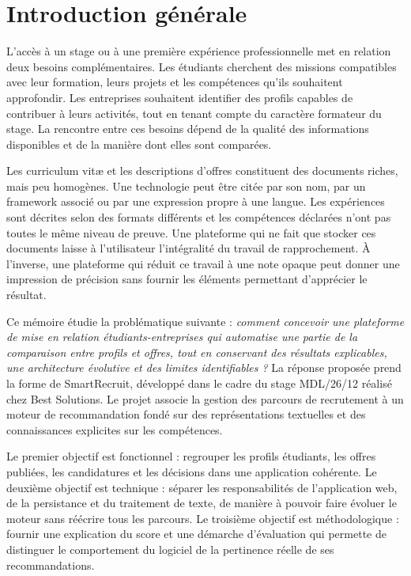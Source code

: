 \chapter*{Introduction générale}
L'accès à un stage ou à une première expérience professionnelle met en relation deux besoins complémentaires. Les étudiants cherchent des missions compatibles avec leur formation, leurs projets et les compétences qu'ils souhaitent approfondir. Les entreprises souhaitent identifier des profils capables de contribuer à leurs activités, tout en tenant compte du caractère formateur du stage. La rencontre entre ces besoins dépend de la qualité des informations disponibles et de la manière dont elles sont comparées.

Les curriculum vitæ et les descriptions d'offres constituent des documents riches, mais peu homogènes. Une technologie peut être citée par son nom, par un framework associé ou par une expression propre à une langue. Les expériences sont décrites selon des formats différents et les compétences déclarées n'ont pas toutes le même niveau de preuve. Une plateforme qui ne fait que stocker ces documents laisse à l'utilisateur l'intégralité du travail de rapprochement. À l'inverse, une plateforme qui réduit ce travail à une note opaque peut donner une impression de précision sans fournir les éléments permettant d'apprécier le résultat.

Ce mémoire étudie la problématique suivante : \emph{comment concevoir une plateforme de mise en relation étudiants-entreprises qui automatise une partie de la comparaison entre profils et offres, tout en conservant des résultats explicables, une architecture évolutive et des limites identifiables ?} La réponse proposée prend la forme de SmartRecruit, développé dans le cadre du stage MDL/26/12 réalisé chez Best Solutions. Le projet associe la gestion des parcours de recrutement à un moteur de recommandation fondé sur des représentations textuelles et des connaissances explicites sur les compétences.

Le premier objectif est fonctionnel : regrouper les profils étudiants, les offres publiées, les candidatures et les décisions dans une application cohérente. Le deuxième objectif est technique : séparer les responsabilités de l'application web, de la persistance et du traitement de texte, de manière à pouvoir faire évoluer le moteur sans réécrire tous les parcours. Le troisième objectif est méthodologique : fournir une explication du score et une démarche d'évaluation qui permette de distinguer le comportement du logiciel de la pertinence réelle de ses recommandations.

